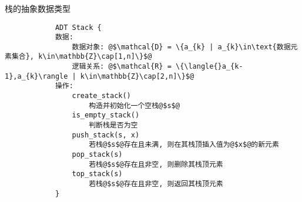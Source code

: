 \begin{fragile}
    \frametitle{\insertsectionhead}
    \begin{block}{栈的抽象数据类型}
        \begin{verbatim}
            ADT Stack {
            数据:
                数据对象: @$\mathcal{D} = \{a_{k} | a_{k}\in\text{数据元素集合}, k\in\mathbb{Z}\cap[1,n]\}$@
                逻辑关系: @$\mathcal{R} = \{\langle{}a_{k-1},a_{k}\rangle | k\in\mathbb{Z}\cap[2,n]\}$@
            操作:
                create_stack()
                    构造并初始化一个空栈@$s$@
                is_empty_stack()
                    判断栈是否为空
                push_stack(s, x)
                    若栈@$s$@存在且未满, 则在其栈顶插入值为@$x$@的新元素
                pop_stack(s)
                    若栈@$s$@存在且非空, 则删除其栈顶元素
                top_stack(s)
                    若栈@$s$@存在且非空, 则返回其栈顶元素
            }
        \end{verbatim}
    \end{block}
\end{fragile}

\begin{fragile}
    \frametitle{\insertsubsectionhead}
\end{fragile}

